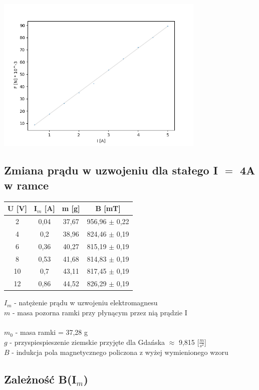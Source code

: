 \documentclass{article}
\begin{document}
\includegraphics[width=10cm]{F(I)_12V}




\subsection{Zmiana prądu w uzwojeniu dla stałego I $=$ 4A w ramce }

\begin{center}
  \begin{tabular}{ c | c | c | c}
  U [V] & I$_m$ [A] & m [g] & B [mT]\\
  \hline
  2 & 0,04 & 37,67 & 956,96 $\pm$ 0,22\\
  4 & 0,2 & 38,96 & 824,46 $\pm$ 0,19\\
  6 & 0,36 & 40,27 & 815,19 $\pm$ 0,19\\
  8 & 0,53 & 41,68 & 814,83 $\pm$ 0,19\\
  10 & 0,7 & 43,11 & 817,45 $\pm$ 0,19\\
  12 & 0,86 & 44,52 & 826,29 $\pm$ 0,19\\
  \end{tabular}
\end{center}
$I_m$ - natężenie prądu w uzwojeniu elektromagnesu \\
$m$ - masa pozorna ramki przy płynącym przez nią prądzie I \\\\
$m_0$ - masa ramki = 37,28 g\\
$g$ - przyspiespieszenie ziemskie przyjęte dla Gdańska $\approx$ 9,815 [$\frac{m}{s^2}$] \\
$B$ - indukcja pola magnetycznego policzona z wyżej wymienionego wzoru \\

\subsection{Zależność B(I$_m$)}
\end{document}
